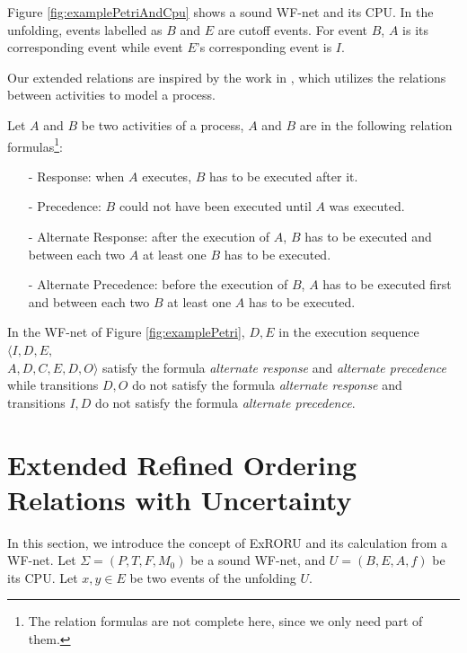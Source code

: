 \documentclass{llncs}
\begin{document}
\begin{example}\label{ex:petriAndCpu}
Figure \ref{fig:examplePetriAndCpu} shows a sound WF-net and its CPU. In the unfolding, events labelled as $B$ and $E$ are cutoff events. For event $B$, $A$ is its corresponding event while event $E$'s corresponding event is $I$.
\end{example}

Our extended relations are inspired by the work in \cite{van2006decserflow}, which utilizes the relations between activities to model a process.
\begin{definition}\label{def:relationFormulas}
Let $A$ and $B$ be two activities of a process, $A$ and $B$ are in the following relation formulas\footnote{The relation formulas \cite{van2006decserflow} are not complete here, since we only need part of them.}:
	\begin{itemize}
		\item[-] Response: when $A$ executes, $B$ has to be executed after it.
		\item[-] Precedence: $B$ could not have been executed until $A$ was executed.
		\item[-] Alternate Response: after the execution of $A$, $B$ has to be executed and between each two $A$ at least one $B$ has to be executed.
		\item[-] Alternate Precedence: before the execution of $B$, $A$ has to be executed first and between each two $B$ at least one $A$ has to be executed.
	\end{itemize}
\end{definition}

\begin{example}\label{ex:relationFormulas}
In the WF-net of Figure \ref{fig:examplePetri}, $D,E$ in the execution sequence $\langle I,D,E,$\\$A,D,C,E,D,O\rangle$ satisfy the formula \textit{alternate response} and \textit{alternate precedence} while transitions $D,O$ do not satisfy the formula \textit{alternate response} and transitions $I,D$ do not satisfy the formula \textit{alternate precedence}.
\end{example}

\section{Extended Refined Ordering Relations with Uncertainty}\label{sec:relations}
In this section, we introduce the concept of ExRORU and its calculation from a WF-net. Let $\Sigma=(P,T,F,M_{0})$ be a sound WF-net, and $U=(B,E,A,f)$ be its CPU. Let $x,y\in E$ be two events of the unfolding $U$.
\end{document}
